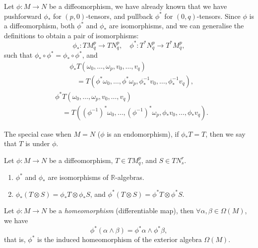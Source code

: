 \documentclass[openany, oneside, a5paper]{book}
\begin{document}
Let $\phi \colon M \to N$ be a diffeomorphism, we have already known that we have pushforward $\phi_*$ for $(p, 0)$-tensors, and pullback $\phi^*$ for $(0, q)$-tensors.
Since $\phi$ is a diffeomorphism, both $\phi^*$ and $\phi_*$ are isomorphisms, and we can generalise the definitions to obtain a pair of isomorphisms:
\begin{equation}
    \phi_* \colon TM^p_q \to TN^p_q, \quad \phi^* \colon T^*N^p_q \to T^*M^p_q,
\end{equation}
such that $\phi_* \circ \phi^* = \phi_* \circ \phi^*$, and
\begin{align}
    &\phi_* T(\omega_0, \ldots, \omega_p, v_0, \ldots, v_q)
    \\
    &\quad =
    T(\phi^* \omega_0, \ldots, \phi^* \omega_p, \phi^{-1}_* v_0, \ldots, \phi^{-1}_* v_q),
\end{align}
\begin{align}
    &\phi^* T(\omega_0, \ldots, \omega_p, v_0, \ldots, v_q)
    \\
    &\quad =
    T((\phi^{-1})^* \omega_0, \ldots, (\phi^{-1})^* \omega_p, \phi_* v_0, \ldots, \phi_* v_q).
\end{align}

The special case when $M = N$ ($\phi$ is an endomorphism), if $\phi_*T = T$, then we say that $T$ is  under $\phi$.

\begin{theorem}
    Let $\phi \colon M \to N$ be a diffeomorphism, $T \in TM^p_q$, and $S \in TN^r_s$.
    \begin{enumerate}
        \item $\phi^*$ and $\phi_*$ are isomorphisms of $\mathbb R$-algebras.
        \item $\phi_* (T \otimes S) = \phi_* T \otimes \phi_*S$, and $\phi^* (T \otimes S) = \phi^* T \otimes \phi^*S$.
    \end{enumerate}
\end{theorem}

\begin{theorem}
    Let $\phi \colon M \to N$ be a \emph{homeomorphism} (differentiable map), then $\forall \alpha, \beta \in \Omega(M)$, we have
    \begin{equation}
        \phi^* (\alpha \wedge \beta) = \phi^* \alpha \wedge \phi^* \beta,
    \end{equation}
    that is, $\phi^*$ is the induced homeomorphism of the exterior algebra $\Omega(M)$.
\end{theorem}
\end{document}
